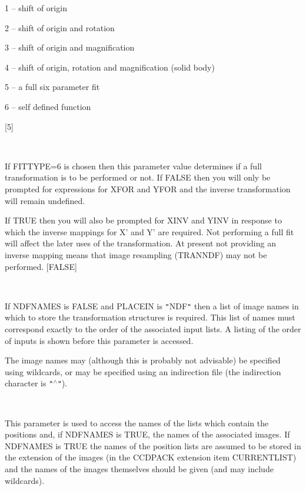 \documentclass[twoside,11pt]{article}
\newcommand{\htmlref}[2]{#1}
\renewcommand{\_}{\texttt{\symbol{95}}}
\newcommand{\qt}[1]{{\tt "}#1{\tt "}}
\newcommand{\xroutine}[1]{\htmlref{{\sc #1}}{#1}}
\newcommand{\sstsubsection}[1]{ \item[{#1}] \mbox{} \\}
\newcommand{\sstitem}{\item}
\newcommand{\sstsubsection}[1]{\item[{#1}]}
\newcommand{\sstitem}{\item}
\begin{document}
{{{{            \sstitem
               1 -- shift of origin

            \sstitem
               2 -- shift of origin and rotation

            \sstitem
               3 -- shift of origin and magnification

            \sstitem
               4 -- shift of origin, rotation and magnification (solid
                      body)

            \sstitem
               5 -- a full six parameter fit

            \sstitem
               6 -- self defined function

         }
         [5]
      }
      \sstsubsection{
         FULL = \_LOGICAL (Read)
      } {
         If FITTYPE=6 is chosen then this parameter value determines
         if a full transformation is to be performed or not. If FALSE
         then you will only be prompted for expressions for XFOR and
         YFOR and the inverse transformation will remain undefined.

         If TRUE then you will also be prompted for XINV and YINV in
         response to which the inverse mappings for X' and Y' are
         required. Not performing a full fit will affect the later
         uses of the transformation. At present not providing an inverse
         mapping means that image resampling (\xroutine{TRANNDF}) may not be
         performed.
         [FALSE]
      }
      \sstsubsection{
         IN = LITERAL (Read)
      } {
         If NDFNAMES is FALSE and PLACEIN is \qt{NDF} then a list of image
         names in which to store the transformation structures is
         required. This list of names must correspond exactly to the
         order of the associated input lists. A listing of the order
         of inputs is shown before this parameter is accessed.

         The image names may (although this is probably not advisable)
         be specified using wildcards, or may be specified using an
         indirection file (the indirection character is \qt{$^\wedge$}).
      }
      \sstsubsection{
         INLIST = LITERAL (Read)
      } {
         This parameter is used to access the names of the lists
         which contain the positions and, if NDFNAMES is TRUE, the names
         of the associated images. If NDFNAMES is TRUE the names of the
         position lists are assumed to be stored in the extension of the
         images (in the CCDPACK extension item CURRENT\_LIST) and the names
         of the images themselves should be given (and may include
         wildcards).

}}}
\end{document}
